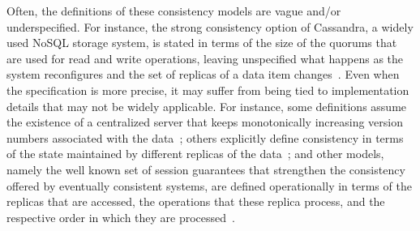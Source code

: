 \documentclass[journal, compsoc]{IEEEtran}
\begin{document}
	Often, the definitions of these consistency models are vague and/or underspecified. For instance, the strong consistency option of Cassandra, a widely used NoSQL storage system, is stated in terms of the size of the quorums that are used for read and write operations, leaving unspecified what happens as the system reconfigures and the set of replicas of a data item changes~\cite{cassandra-consistency}.
	Even when the specification is more precise, it may suffer from being tied to implementation details that may not be widely applicable. For instance, some definitions assume the existence of a centralized server that keeps monotonically increasing version numbers associated with the data~\cite{DBLP:conf/icde/AdyaLO00}; others explicitly define consistency in terms of the state maintained by different replicas of the data~\cite{Li:2012:MGS:2387880.2387906}; and other models, namely the well known set of session guarantees that strengthen the consistency offered by eventually consistent systems, are defined operationally in terms of the replicas that are accessed, the operations that these replica process, and the respective order in which they are processed~\cite{bayou}.
	
\end{document}
